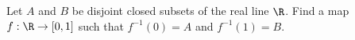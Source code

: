 Let $A$ and $B$ be disjoint closed subsets of the real line $\R$. Find
a map $f:\R\rightarrow [0,1]$ such that $f^{-1}(0)=A$ and
$f^{-1}(1)=B$. 
